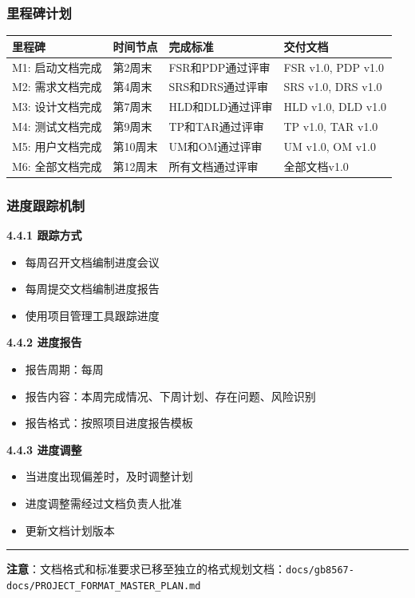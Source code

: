 \documentclass[12pt,a4paper]{article}
\numberwithin{equation}{section}  %
\begin{document}
\subsubsection{里程碑计划}
\begin{longtable}{|p{3cm}|p{4cm}|p{4cm}|p{3cm}|}
\hline
里程碑 & 时间节点 & 完成标准 & 交付文档 \\
\hline
M1: 启动文档完成 & 第2周末 & FSR和PDP通过评审 & FSR v1.0, PDP v1.0 \\
M2: 需求文档完成 & 第4周末 & SRS和DRS通过评审 & SRS v1.0, DRS v1.0 \\
M3: 设计文档完成 & 第7周末 & HLD和DLD通过评审 & HLD v1.0, DLD v1.0 \\
M4: 测试文档完成 & 第9周末 & TP和TAR通过评审 & TP v1.0, TAR v1.0 \\
M5: 用户文档完成 & 第10周末 & UM和OM通过评审 & UM v1.0, OM v1.0 \\
M6: 全部文档完成 & 第12周末 & 所有文档通过评审 & 全部文档v1.0 \\
\hline
\end{longtable}

\subsubsection{进度跟踪机制}
\textbf{4.4.1 跟踪方式}
\begin{itemize}
\item 每周召开文档编制进度会议
\item 每周提交文档编制进度报告
\item 使用项目管理工具跟踪进度
\end{itemize}

\textbf{4.4.2 进度报告}
\begin{itemize}
\item 报告周期：每周
\item 报告内容：本周完成情况、下周计划、存在问题、风险识别
\item 报告格式：按照项目进度报告模板
\end{itemize}

\textbf{4.4.3 进度调整}
\begin{itemize}
\item 当进度出现偏差时，及时调整计划
\item 进度调整需经过文档负责人批准
\item 更新文档计划版本
\end{itemize}

\hrule
\textbf{注意}：文档格式和标准要求已移至独立的格式规划文档：\texttt{docs/gb8567-docs/PROJECT\_FORMAT\_MASTER\_PLAN.md}
\end{document}
